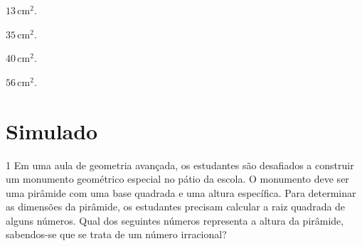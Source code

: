 \begin{escolha}
\item $13\,\text{cm}^2$.

\item $35\,\text{cm}^2$.

\item $40\,\text{cm}^2$.

\item $56\,\text{cm}^2$.
\end{escolha}






%




\chapter[Simulado 3]{Simulado}

\num{1} Em uma aula de geometria avançada, os estudantes são desafiados a construir
um monumento geométrico especial no pátio da escola. O monumento deve ser uma
pirâmide com uma base quadrada e uma altura específica. Para determinar as dimensões
da pirâmide, os estudantes precisam calcular a raiz quadrada de alguns números.
Qual dos seguintes números representa a altura da pirâmide, sabendos-se que se trata
de um número irracional?

